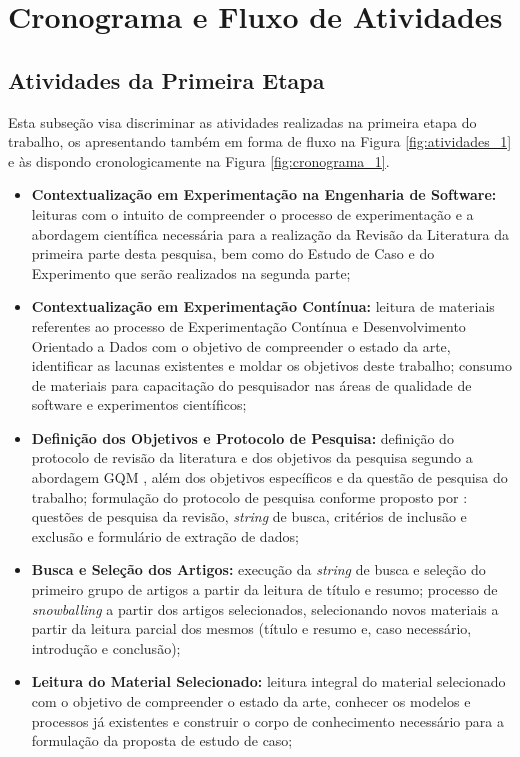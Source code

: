 \section{Cronograma e Fluxo de Atividades}\label{cronograma}

\subsection{Atividades da Primeira Etapa}
\label{cronograma1}

Esta subseção visa discriminar as atividades realizadas na primeira etapa do trabalho, os apresentando também em forma de fluxo na Figura \ref{fig:atividades_1} e às dispondo cronologicamente na Figura \ref{fig:cronograma_1}.

\begin{itemize}
    \item \textbf{Contextualização em Experimentação na Engenharia de Software:} leituras com o intuito de compreender o processo de experimentação e a abordagem científica necessária para a realização da Revisão da Literatura da primeira parte desta pesquisa, bem como do Estudo de Caso e do Experimento que serão realizados na segunda parte;
    \item \textbf{Contextualização em Experimentação Contínua:} leitura de materiais referentes ao processo de Experimentação Contínua e Desenvolvimento Orientado a Dados com o objetivo de compreender o estado da arte, identificar as lacunas existentes e moldar os objetivos deste trabalho; consumo de materiais para capacitação do pesquisador nas áreas de qualidade de software e experimentos científicos;
    \item \textbf{Definição dos Objetivos e Protocolo de Pesquisa:} definição do protocolo de revisão da literatura e dos objetivos da pesquisa segundo a abordagem GQM \cite{basili_goal_1994}, além dos objetivos específicos e da questão de pesquisa do trabalho; formulação do protocolo de pesquisa conforme proposto por : questões de pesquisa da revisão, \textit{string} de busca, critérios de inclusão e exclusão e formulário de extração de dados;
    \item \textbf{Busca e Seleção dos Artigos:} execução da \textit{string} de busca e seleção do primeiro grupo de artigos a partir da leitura de título e resumo; processo de \textit{snowballing} a partir dos artigos selecionados, selecionando novos materiais a partir da leitura parcial dos mesmos (título e resumo e, caso necessário, introdução e conclusão);
    \item \textbf{Leitura do Material Selecionado:} leitura integral do material selecionado com o objetivo de compreender o estado da arte, conhecer os modelos e processos já existentes e construir o corpo de conhecimento necessário para a formulação da proposta de estudo de caso;

\end{itemize}
